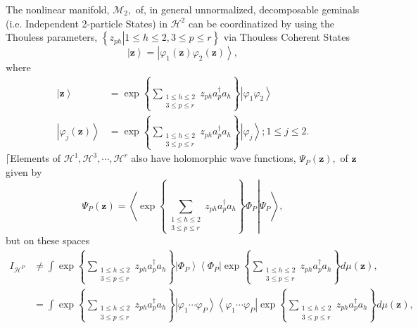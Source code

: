 \documentclass[aps,preprint]{revtex4}%
\begin{document}
The nonlinear manifold, $\mathcal{M}_{2},$ of, in general unnormalized,
decomposable geminals (i.e. Independent 2-particle States) in $\mathcal{H}%
^{2}$ can be coordinatized by using the Thouless parameters, $\left\{  \left.
z_{ph}\right\vert 1\leq h\leq2,3\leq p\leq r\right\}  $ via Thouless Coherent
States
\begin{equation}
\left\vert \mathbf{z}\right\rangle =\left\vert \varphi_{1}\left(
\mathbf{z}\right)  \varphi_{2}\left(  \mathbf{z}\right)  \right\rangle ,
\end{equation}
where
\begin{align}
\left\vert \mathbf{z}\right\rangle  &  =\exp\left\{  \sum
\limits_{\substack{1\leq h\leq2\\3\leq p\leq r}}z_{ph}a_{p}^{\dagger}%
a_{h}\right\}  \left\vert \varphi_{1}\varphi_{2}\right\rangle \\
\left\vert \varphi_{j}\left(  \mathbf{z}\right)  \right\rangle  &
=\exp\left\{  \sum\limits_{\substack{1\leq h\leq2\\3\leq p\leq r}}z_{ph}%
a_{p}^{\dagger}a_{h}\right\}  \left\vert \varphi_{j}\right\rangle ;1\leq
j\leq2.
\end{align}
$\lceil$Elements of $\mathcal{H}^{1},\mathcal{H}^{3},\cdots,\mathcal{H}^{r}$
also have holomorphic wave functions, $\Psi_{P}\left(  \mathbf{z}\right)  ,$
of $\mathbf{z}$ given by
\begin{equation}
\Psi_{P}\left(  \mathbf{z}\right)  =\left\langle \left.  \exp\left\{
\sum\limits_{\substack{1\leq h\leq2\\3\leq p\leq r}}z_{ph}a_{p}^{\dagger}%
a_{h}\right\}  \Phi_{P}\right\vert \Psi_{P}\right\rangle ,
\end{equation}
but on these spaces
\begin{align}
I_{\mathcal{H}^{P}}  &  \neq\int\exp\left\{  \sum\limits_{\substack{1\leq
h\leq2\\3\leq p\leq r}}z_{ph}a_{p}^{\dagger}a_{h}\right\}  \left\vert \Phi
_{P}\right\rangle \left\langle \Phi_{P}\right\vert \exp\left\{  \sum
\limits_{\substack{1\leq h\leq2\\3\leq p\leq r}}z_{ph}a_{p}^{\dagger}%
a_{h}\right\}  d\mu\left(  \mathbf{z}\right)  ,\nonumber\\
&  =\int\exp\left\{  \sum\limits_{\substack{1\leq h\leq2\\3\leq p\leq
r}}z_{ph}a_{p}^{\dagger}a_{h}\right\}  \left\vert \varphi_{1}\cdots\varphi
_{P}\right\rangle \left\langle \varphi_{1}\cdots\varphi_{P}\right\vert
\exp\left\{  \sum\limits_{\substack{1\leq h\leq2\\3\leq p\leq r}}z_{ph}%
a_{p}^{\dagger}a_{h}\right\}  d\mu\left(  \mathbf{z}\right)  ,
\end{align}
\end{document}
